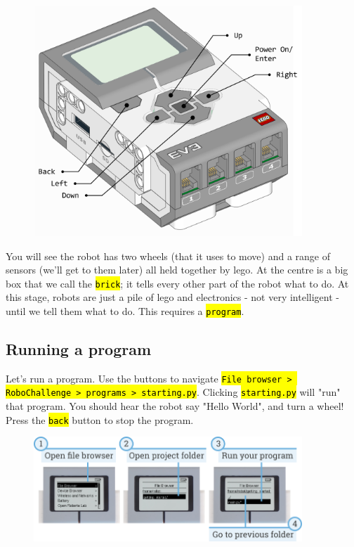 \documentclass[12pt,a4paper]{article}
\newcommand{\vb}[1]{\hl{\texttt{#1}}} %
\begin{document}
\begin{figure}[h]
    \centering
    \includegraphics[width=0.9\textwidth]{assets/ev3brick_labelled.png}
\end{figure}

You will see the robot has two wheels (that it uses to move) and a range of sensors (we'll get to them later) all held together by lego. At the centre is a big box that we call the \vb{brick}; it tells every other part of the robot what to do. At this stage, robots are just a pile of lego and electronics - not very intelligent - until we tell them what to do. This requires a \vb{program}. 

\subsection{ Running a program}
Let's run a program.
Use the buttons to navigate \vb{File browser > RoboChallenge > programs > starting.py}. Clicking \vb{starting.py} will "run" that program. You should hear the robot say "Hello World", and turn a wheel! Press the \vb{back} button to stop the program.

\begin{figure}[h]
    \centering
    \includegraphics[width=0.9\textwidth]{assets/run_program_manual.png}
\end{figure}
\end{document}
